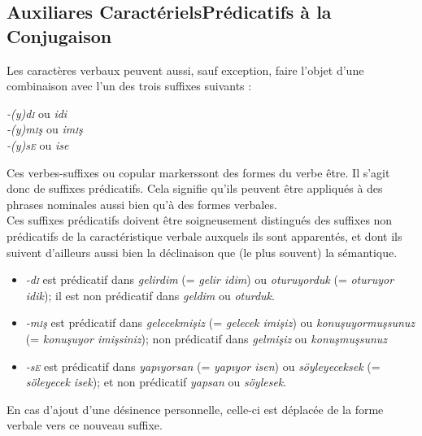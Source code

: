 \documentclass{cours}
\newcommand{\ch}{\c{s}}
\newcommand{\sci}{\textsc{i}}
\newcommand{\sce}{\textsc{e}}
\begin{document}
\subsection{Auxiliares \og Caractériels\fg Prédicatifs à la Conjugaison}
Les caractères verbaux peuvent aussi, sauf exception, faire l'objet d'une combinaison avec l'un des trois suffixes suivants : 
\begin{center}
    {\sl -(y)d\sci} ou {\sl idi}\\
    \textsl{-(y)m\sci \ch} ou \textsl{im\sci \ch}\\
    \textsl{-(y)s\sce} ou \textsl{ise}
\end{center}
Ces \og verbes-suffixes \fg ou \og copular markers\fg sont des formes du verbe \og être\fg. Il s'agit donc de suffixes prédicatifs. Cela signifie qu'ils peuvent être appliqués à des phrases nominales aussi bien qu'à des formes verbales.\\
Ces suffixes prédicatifs doivent être soigneusement distingués des suffixes non prédicatifs de la caractéristique verbale auxquels ils sont apparentés, et dont ils suivent d'ailleurs aussi bien la déclinaison que (le plus souvent) la sémantique. 
\begin{itemize}
    \item \textsl{-d\sci} est prédicatif dans \textsl{gelirdim} (= {\sl gelir idim}) ou \textsl{oturuyorduk} (= {\sl oturuyor idik}); il est non prédicatif dans \textsl{geldim} ou \textsl{oturduk}.
    \item \textsl{-m\sci \ch} est prédicatif dans \textsl{gelecekmi\ch iz} (= {\sl gelecek imi\ch iz}) ou \textsl{konu\ch uyormu\ch sunuz} (= {\sl konu\ch uyor imi\ch siniz}); non prédicatif dans \textsl{gelmi\ch iz} ou \textsl{konu\ch mu\ch sunuz}
    \item \textsl{-s\sce} est prédicatif dans \textsl{yap\i yorsan} (= {\sl yap\i yor isen}) ou \textsl{söyleyeceksek} (= {\sl söleyecek isek}); et non prédicatif \textsl{yapsan} ou \textsl{söylesek}.
\end{itemize}
En cas d'ajout d'une désinence personnelle, celle-ci est déplacée de la forme verbale vers ce nouveau suffixe. \\
\end{document}
